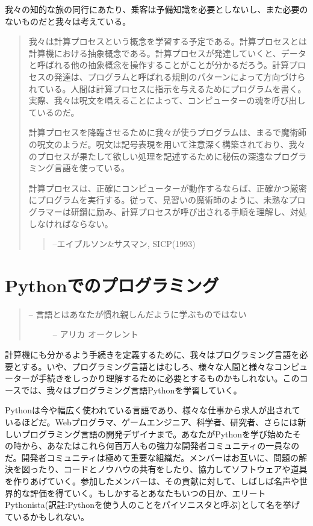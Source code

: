 \documentclass[letterpaper,10pt,dvipdfmx]{sphinxmanual}
\begin{document}
我々の知的な旅の同行にあたり、乗客は予備知識を必要としないし、また必要のないものだと我々は考えている。
\begin{quote}

我々は計算プロセスという概念を学習する予定である。計算プロセスとは計算機における抽象概念である。計算プロセスが発達していくと、データと呼ばれる他の抽象概念を操作することがことが分かるだろう。計算プロセスの発達は、プログラムと呼ばれる規則のパターンによって方向づけられている。人間は計算プロセスに指示を与えるためにプログラムを書く。実際、我々は呪文を唱えることによって、コンピューターの魂を呼び出しているのだ。

計算プロセスを降臨させるために我々が使うプログラムは、まるで魔術師の呪文のようだ。呪文は記号表現を用いて注意深く構築されており、我々のプロセスが果たして欲しい処理を記述するために秘伝の深遠なプログラミング言語を使っている。

計算プロセスは、正確にコンピューターが動作するならば、正確かつ厳密にプログラムを実行する。従って、見習いの魔術師のように、未熟なプログラマーは研鑽に励み、計算プロセスが呼び出される手順を理解し、対処しなければならない。
\begin{quote}

--エイブルソン\&サスマン, SICP(1993)
\end{quote}
\end{quote}


\section{Pythonでのプログラミング}
\label{functions:python}\begin{quote}
\begin{description}
\item[{-- 言語とはあなたが慣れ親しんだように学ぶものではない}] \leavevmode
-- アリカ オークレント

\end{description}
\end{quote}

計算機にも分かるよう手続きを定義するために、我々はプログラミング言語を必要とする。いや、プログラミング言語とはむしろ、様々な人間と様々なコンピューターが手続きをしっかり理解するために必要とするものかもしれない。このコースでは、我々はプログラミング言語Pythonを学習していく。

Pythonは今や幅広く使われている言語であり、様々な仕事から求人が出されているほどだ。Webプログラマ、ゲームエンジニア、科学者、研究者、さらには新しいプログラミング言語の開発デザイナまで。あなたがPythonを学び始めたその時から、あなたはこれら何百万人もの強力な開発者コミュニティの一員なのだ。開発者コミュニティは極めて重要な組織だ。メンバーはお互いに、問題の解決を図ったり、コードとノウハウの共有をしたり、協力してソフトウェアや道具を作りあげていく。参加したメンバーは、その貢献に対して、しばしば名声や世界的な評価を得ていく。もしかするとあなたもいつの日か、エリートPythonista(訳註:Pythonを使う人のことをパイソニスタと呼ぶ)として名を挙げているかもしれない。
\end{document}
